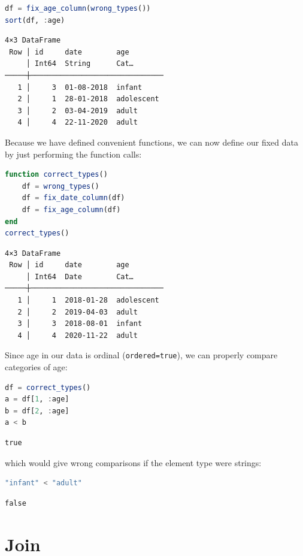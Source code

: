 \documentclass[
  notoc %
]{tufte-book}
\newcommand{\passthrough}[1]{#1}
\begin{document}
\begin{lstlisting}[language=Julia]
df = fix_age_column(wrong_types())
sort(df, :age)
\end{lstlisting}

\begin{lstlisting}[language=Output]
4×3 DataFrame
 Row │ id     date        age
     │ Int64  String      Cat…
─────┼───────────────────────────────
   1 │     3  01-08-2018  infant
   2 │     1  28-01-2018  adolescent
   3 │     2  03-04-2019  adult
   4 │     4  22-11-2020  adult
\end{lstlisting}

Because we have defined convenient functions, we can now define our
fixed data by just performing the function calls:

\begin{lstlisting}[language=Julia]
function correct_types()
    df = wrong_types()
    df = fix_date_column(df)
    df = fix_age_column(df)
end
correct_types()
\end{lstlisting}

\begin{lstlisting}[language=Output]
4×3 DataFrame
 Row │ id     date        age
     │ Int64  Date        Cat…
─────┼───────────────────────────────
   1 │     1  2018-01-28  adolescent
   2 │     2  2019-04-03  adult
   3 │     3  2018-08-01  infant
   4 │     4  2020-11-22  adult
\end{lstlisting}

Since age in our data is ordinal
(\passthrough{\lstinline!ordered=true!}), we can properly compare
categories of age:

\begin{lstlisting}[language=Julia]
df = correct_types()
a = df[1, :age]
b = df[2, :age]
a < b
\end{lstlisting}

\begin{lstlisting}[language=Output]
true
\end{lstlisting}

which would give wrong comparisons if the element type were strings:

\begin{lstlisting}[language=Julia]
"infant" < "adult"
\end{lstlisting}

\begin{lstlisting}[language=Output]
false
\end{lstlisting}

\hypertarget{sec:join}{%
\section{Join}\label{sec:join}}
\end{document}

